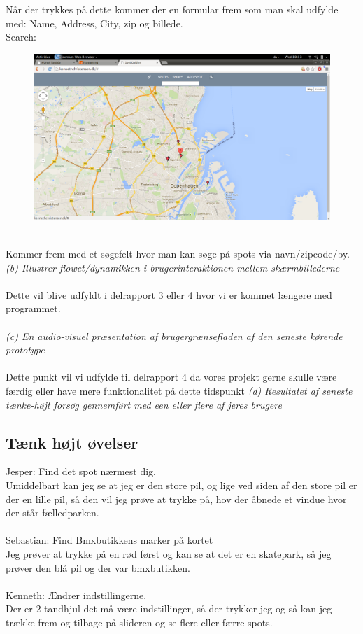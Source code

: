 \documentclass[12pt]{article}
\begin{document}
Når der trykkes på dette kommer der en formular frem som man skal udfylde med: Name, Address, City, zip og billede.\\
\pagebreak
Search: 
\begin{figure}[h]
\includegraphics[scale = 0.21]{Search}
\end{figure}\\
Kommer frem med et søgefelt hvor man kan søge på spots via navn/zipcode/by.\\

\textit{(b) Illustrer flowet/dynamikken i brugerinteraktionen mellem skærmbillederne}\\\\
Dette vil blive udfyldt i delrapport 3 eller 4 hvor vi er kommet længere med programmet.\\\\
\textit{(c) En audio-visuel præsentation af brugergrænsefladen af den seneste kørende prototype}\\\\
Dette punkt vil vi udfylde til delrapport 4 da vores projekt gerne skulle være færdig eller have mere funktionalitet på dette tidspunkt
\newpage
\textit{(d) Resultatet af seneste tænke-højt forsøg gennemført med een eller flere af jeres brugere}
\subsection{Tænk højt øvelser}
Jesper: Find det spot nærmest dig.\\
Umiddelbart kan jeg se at jeg er den store pil, og lige ved siden af den store pil er der en lille pil, så den vil jeg prøve at trykke på, hov der åbnede et vindue hvor der står fælledparken.\\\\
Sebastian: Find Bmxbutikkens marker på kortet\\
Jeg prøver at trykke på en rød først og kan se at det er en skatepark, så jeg prøver den blå pil og der var bmxbutikken.\\\\
Kenneth: Ændrer indstillingerne.\\
Der er 2 tandhjul det må være indstillinger, så der trykker jeg og så kan jeg trække frem og tilbage på slideren og se flere eller færre spots.\\\\
\end{document}
